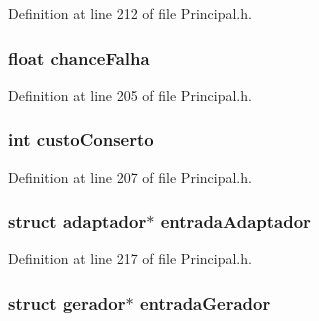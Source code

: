 Definition at line 212 of file Principal.\-h.

\hypertarget{structinterconexao_aa8ab52bccf94e202dc5c2b5c6a1c031b}{
\subsubsection[{chance\-Falha}]{\setlength{\rightskip}{0pt plus 5cm}float chance\-Falha}}\label{structinterconexao_aa8ab52bccf94e202dc5c2b5c6a1c031b}


Definition at line 205 of file Principal.\-h.

\hypertarget{structinterconexao_aa3f746c0d39f7be1ecded1e29cf8dc9a}{
\subsubsection[{custo\-Conserto}]{\setlength{\rightskip}{0pt plus 5cm}int custo\-Conserto}}\label{structinterconexao_aa3f746c0d39f7be1ecded1e29cf8dc9a}


Definition at line 207 of file Principal.\-h.

\hypertarget{structinterconexao_a14e2e66fac149b7994e268306d30326f}{
\subsubsection[{entrada\-Adaptador}]{\setlength{\rightskip}{0pt plus 5cm}struct {\bf adaptador}$\ast$ entrada\-Adaptador}}\label{structinterconexao_a14e2e66fac149b7994e268306d30326f}


Definition at line 217 of file Principal.\-h.

\hypertarget{structinterconexao_a84fba959cbecb5e3c55e9bd2907c8a82}{
\subsubsection[{entrada\-Gerador}]{\setlength{\rightskip}{0pt plus 5cm}struct {\bf gerador}$\ast$ entrada\-Gerador}}\label{structinterconexao_a84fba959cbecb5e3c55e9bd2907c8a82}


